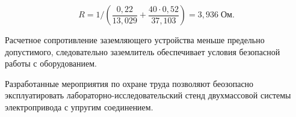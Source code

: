         \begin{equation*}
                R = 1 / \left( \frac{0,22}{13,029} +
                    \frac{40 \cdot 0,52}{37,103} \right)
                        = 3,936 \; \text{Ом}.
        \end{equation*}

        Расчетное сопротивление заземляющего устройства меньше предельно
        допустимого, следовательно заземлитель обеспечивает условия безопасной
        работы с оборудованием.

        Разработанные мероприятия по охране труда позволяют беозопасно
        эксплуатировать лабораторно-исследовательский стенд двухмассовой
        системы электропривода с упругим соединением.

